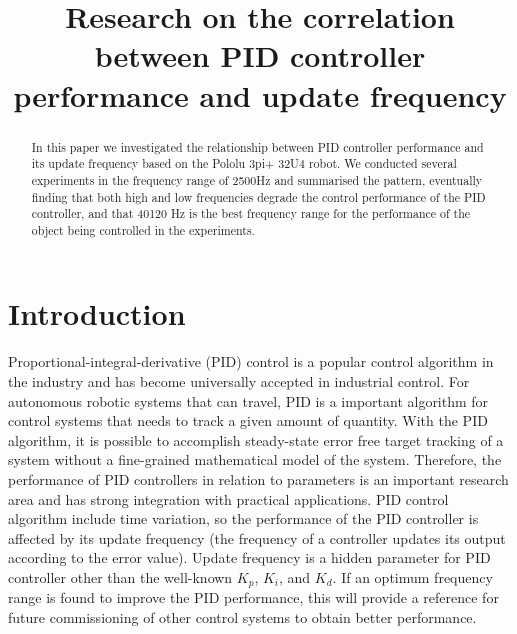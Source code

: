 \documentclass[conference]{IEEEtran}
\begin{document}
\title{Research on the correlation between PID controller performance and update frequency}

\author{
    \and
}

\maketitle

\begin{abstract}
In this paper we investigated the relationship between PID controller performance and its update frequency based on the Pololu 3pi+ 32U4 robot. We conducted several experiments in the frequency range of 2\bm{$\sim$}500Hz and summarised the pattern, eventually finding that both high and low frequencies degrade the control performance of the PID controller, and that 40\bm{$\sim$}120 Hz is the best frequency range for the performance of the object being controlled in the experiments.
\end{abstract}


\section{Introduction}
\label{Introduction}
Proportional-integral-derivative (PID) control is a popular control algorithm in the industry and has become universally accepted in industrial control\cite{knospe2006pid}. For autonomous robotic systems that can travel, 
PID is a important algorithm for control systems that needs to track a given amount of quantity. With the PID algorithm, it is possible to accomplish steady-state error free target tracking of a system without a fine-grained mathematical model of the system. Therefore, the performance of PID controllers in relation to parameters is an important research area and has strong integration with practical applications.
PID control algorithm include time variation, so the performance of the PID controller is affected by its update frequency (the frequency of a controller updates its output according to the error value). Update frequency is a hidden parameter for PID controller other than the well-known $K_{p}$, $K_{i}$, and $K_{d}$. 
 If an optimum frequency range is found to improve the PID performance, this will provide a reference for future commissioning of other control systems to obtain better performance.
\end{document}
